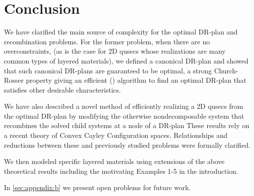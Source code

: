 \section{Conclusion}
% 

We have clarified the main source of complexity for the optimal DR-plan and recombination problems. For the former problem, when there are no overconstraints, (as is the case for 2D qusecs whose realizations are many common types of layered materials), we defined a canonical DR-plan and showed that such canonical DR-plans are guaranteed to be optimal, a strong Church-Rosser property giving an efficient (\candrpcomplexity) algorithm to find an optimal  DR-plan that satisfies other desirable characteristics.

We have also described a novel method of efficiently realizing a 2D qusecs from the optimal DR-plan by modifying the otherwise nondecomposable system that recombines the solved child systems at a node of a DR-plan These results rely on a recent theory of Convex Cayley Configuration spaces. Relationships and reductions between these and previously studied problems were formally clarified.

We then modeled specific layered materials using extensions of the above theoretical results including the motivating Examples 1-5 in the introduction.

In \ref{sec:appendix:b} we present open problems for future work.
